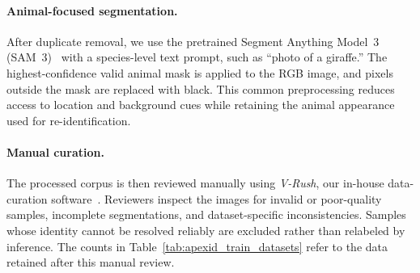 \begin{table}[t]
\centering
\caption{Cosine-similarity thresholds for within-identity near-duplicate
removal. A value of $2.0$ denotes disabled filtering.}
\label{tab:duplicate_thresholds}
\end{table}

\paragraph{Animal-focused segmentation.}
\label{sec:dataset:segmentation}
After duplicate removal, we use the pretrained Segment Anything Model~3
(SAM~3)~\cite{carion2025sam3} with a species-level text prompt, such as
``photo of a giraffe.'' The
highest-confidence valid animal mask is applied to the RGB image, and pixels
outside the mask are replaced with black. This common preprocessing reduces
access to location and background cues while retaining the animal appearance
used for re-identification.

\paragraph{Manual curation.}
The processed corpus is then reviewed manually using \textit{V-Rush}, our
in-house data-curation software~\cite{elbassat_vrush_2026}. Reviewers inspect the images for invalid or
poor-quality samples, incomplete segmentations, and dataset-specific inconsistencies. Samples whose identity cannot be resolved reliably are excluded rather than relabeled by inference. The counts in
Table~\ref{tab:apexid_train_datasets} refer to the data retained after this
manual review.

